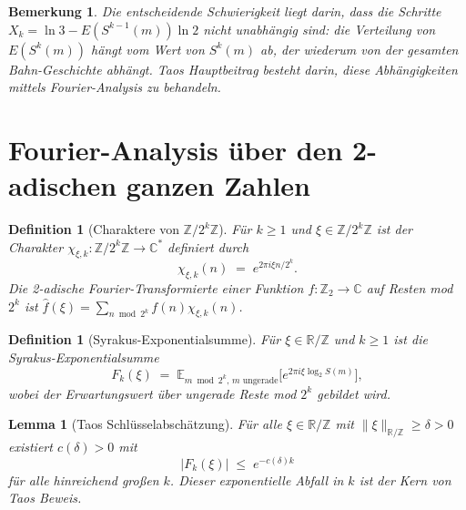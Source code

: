 \documentclass[12pt,a4paper]{article}
\newtheorem{lemma}[theorem]{Lemma}
\newtheorem{definition}[theorem]{Definition}
\newtheorem{remark}[theorem]{Bemerkung}
\begin{document}
\begin{remark}\label{rem:nicht_unabhaengig}
Die entscheidende Schwierigkeit liegt darin, dass die Schritte $X_k = \ln 3 - E(S^{k-1}(m)) \ln 2$
\emph{nicht} unabhängig sind: die Verteilung von $E(S^k(m))$ hängt vom Wert von $S^k(m)$
ab, der wiederum von der gesamten Bahn-Geschichte abhängt. Taos Hauptbeitrag besteht
darin, diese Abhängigkeiten mittels Fourier-Analysis zu behandeln.
\end{remark}

\section{Fourier-Analysis über den 2-adischen ganzen Zahlen}

\begin{definition}[Charaktere von $\mathbb{Z}/2^k\mathbb{Z}$]\label{def:charaktere}
Für $k \geq 1$ und $\xi \in \mathbb{Z}/2^k\mathbb{Z}$ ist der \emph{Charakter}
$\chi_{\xi,k}\colon \mathbb{Z}/2^k\mathbb{Z} \to \mathbb{C}^*$ definiert durch
\[
  \chi_{\xi,k}(n) \;=\; e^{2\pi i \xi n / 2^k}.
\]
Die 2-adische Fourier-Transformierte einer Funktion $f\colon \mathbb{Z}_2 \to \mathbb{C}$
auf Resten mod $2^k$ ist $\hat{f}(\xi) = \sum_{n \bmod 2^k} f(n) \chi_{\xi,k}(n)$.
\end{definition}

\begin{definition}[Syrakus-Exponentialsumme]\label{def:exp_summe}
Für $\xi \in \mathbb{R}/\mathbb{Z}$ und $k \geq 1$ ist die \emph{Syrakus-Exponentialsumme}
\[
  F_k(\xi) \;=\; \mathbb{E}_{m \bmod 2^k,\, m \text{ ungerade}}\bigl[ e^{2\pi i \xi \log_2 S(m)} \bigr],
\]
wobei der Erwartungswert über ungerade Reste mod $2^k$ gebildet wird.
\end{definition}

\begin{lemma}[Taos Schlüsselabschätzung]\label{lem:schluessel}
Für alle $\xi \in \mathbb{R}/\mathbb{Z}$ mit $\|\xi\|_{\mathbb{R}/\mathbb{Z}} \geq \delta > 0$
existiert $c(\delta) > 0$ mit
\[
  |F_k(\xi)| \;\leq\; e^{-c(\delta) k}
\]
für alle hinreichend großen $k$. Dieser exponentielle Abfall in $k$ ist der Kern
von Taos Beweis.
\end{lemma}
\end{document}
